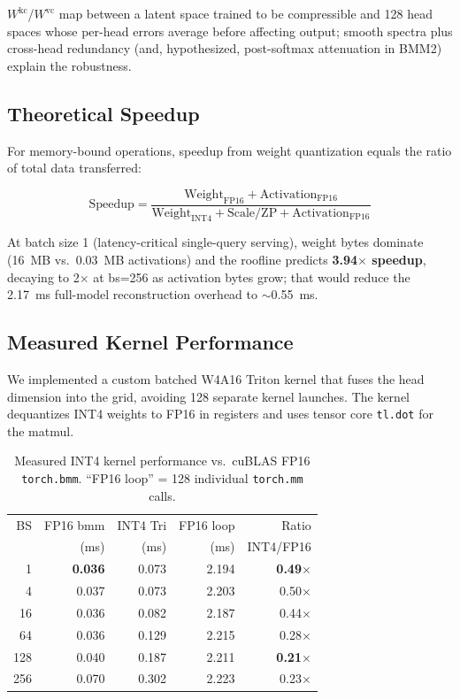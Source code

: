 \documentclass[10pt,twocolumn]{article}
\begin{document}
$W^\text{kc}$/$W^\text{vc}$ map between a latent space trained to be compressible and 128 head spaces whose per-head errors average before affecting output; smooth spectra plus cross-head redundancy (and, hypothesized, post-softmax attenuation in BMM2) explain the robustness.

\subsection{Theoretical Speedup}

For memory-bound operations, speedup from weight quantization equals the ratio of total data transferred:

\begin{equation}
\text{Speedup} = \frac{\text{Weight}_\text{FP16} + \text{Activation}_\text{FP16}}{\text{Weight}_\text{INT4} + \text{Scale/ZP} + \text{Activation}_\text{FP16}}
\label{eq:speedup}
\end{equation}

At batch size 1 (latency-critical single-query serving), weight bytes dominate (16~MB vs.\ 0.03~MB activations) and the roofline predicts \textbf{3.94$\times$ speedup}, decaying to 2$\times$ at bs=256 as activation bytes grow; that would reduce the 2.17~ms full-model reconstruction overhead to $\sim$0.55~ms.

\subsection{Measured Kernel Performance}

We implemented a custom batched W4A16 Triton kernel that fuses the head dimension into the grid, avoiding 128 separate kernel launches.  The kernel dequantizes INT4 weights to FP16 in registers and uses tensor core \texttt{tl.dot} for the matmul.

\begin{table}[h]
\centering
\small
\caption{Measured INT4 kernel performance vs.\ cuBLAS FP16 \texttt{torch.bmm}.  ``FP16 loop'' = 128 individual \texttt{torch.mm} calls.}
\label{tab:int4_measured}
\begin{tabular}{@{}rrrrr@{}}
\toprule
BS & FP16 bmm & INT4 Tri & FP16 loop & Ratio \\
   & (ms) & (ms) & (ms) & INT4/FP16 \\
\midrule
  1 & \textbf{0.036} & 0.073 & 2.194 & \textbf{0.49$\times$} \\
  4 & 0.037 & 0.073 & 2.203 & 0.50$\times$ \\
 16 & 0.036 & 0.082 & 2.187 & 0.44$\times$ \\
 64 & 0.036 & 0.129 & 2.215 & 0.28$\times$ \\
128 & 0.040 & 0.187 & 2.211 & \textbf{0.21$\times$} \\
256 & 0.070 & 0.302 & 2.223 & 0.23$\times$ \\
\bottomrule
\end{tabular}
\end{table}
\end{document}
